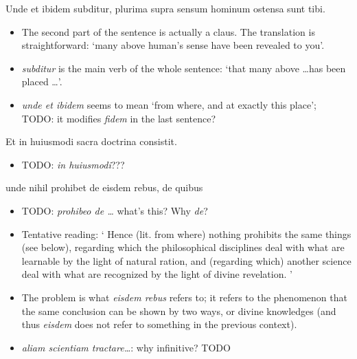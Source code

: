 \documentclass[a4paper, 12pt]{article}
\newcommand{\form}[1]{\emph{#1}}
\newcommand{\translate}[1]{`#1'}
\begin{document}
\begin{exe}
    \ex Unde et ibidem subditur, plurima supra sensum hominum ostensa sunt tibi.
\end{exe}

\begin{itemize}
    \item The second part of the sentence is actually a claus.
    The translation is straightforward: 
    \translate{many above human's sense have been revealed to you}.
    \item \form{subditur} is the main verb of the whole sentence:
    \translate{that many above \dots has been placed \dots}.
    \item \form{unde et ibidem} seems to mean \translate{from where, and at exactly this place}; 
    TODO: it modifies \form{fidem} in the last sentence?
\end{itemize}

\begin{exe}
    \ex Et in huiusmodi sacra doctrina consistit.
\end{exe}

\begin{itemize}
    \item TODO: \form{in huiusmodi}???
\end{itemize}

\begin{exe}
    \ex unde nihil prohibet de eisdem rebus, de quibus 
\end{exe}

\begin{itemize}
    \item TODO: \form{prohibeo de \dots} what's this? Why \form{de}?
    \item Tentative reading: \translate{
        Hence (lit. from where) nothing prohibits the same things (see below), 
        regarding which the philosophical disciplines deal with 
        what are learnable by the light of natural ration, 
        and (regarding which) another science deal with what are recognized by the light of divine revelation. 
    } 
    \item The problem is what \form{eisdem rebus} refers to; 
    it refers to the phenomenon that the same conclusion can be shown by two ways, 
    or divine knowledges (and thus \form{eisdem} does not refer to something in the previous context).
    \item \form{aliam scientiam tractare\dots}: why infinitive? TODO
\end{itemize}
\end{document}
